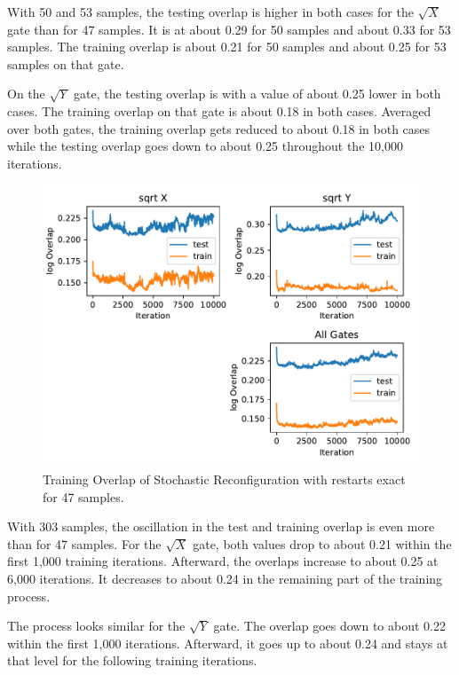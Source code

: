 With 50 and 53 samples, the testing overlap is higher in both cases for the $\sqrt{X}$ gate than for 
47 samples. It is at about 0.29 for 50 samples and about 0.33 for 53 samples. The training overlap is about 
0.21 for 50 samples and about 0.25 for 53 samples on that gate.

On the $\sqrt{Y}$ gate, the testing overlap is with a value of about 0.25 lower in both cases. The 
training overlap on that gate is about 0.18 in both cases. Averaged over both gates, the training 
overlap gets reduced to about 0.18 in both cases while the testing overlap goes down to about 0.25 
throughout the 10,000 iterations.

\begin{figure}[H]
  \centering
  \includegraphics[width=\textwidth]{figures/results/SR-restarts-not-learned/avgOverlap_47.pdf}
  \caption[Training overlap of Stochastic Reconfiguration with restarts exact]{Training 
  Overlap of Stochastic Reconfiguration with restarts exact for 47 samples.}
  \label{fig:sr_exact_overlap_47}
\end{figure}

With 303 samples, the oscillation in the test and training overlap is even more than for 47 samples. 
For the $\sqrt{X}$ gate, both values drop to about 0.21 within the first 1,000 training iterations. 
Afterward, the overlaps increase to about 0.25 at 6,000 iterations. It decreases to about 0.24 in the 
remaining part of the training process.

The process looks similar for the $\sqrt{Y}$ gate. The overlap goes down to about 0.22 within the 
first 1,000 iterations. Afterward, it goes up to about 0.24 and stays at that level for the 
following training iterations.

